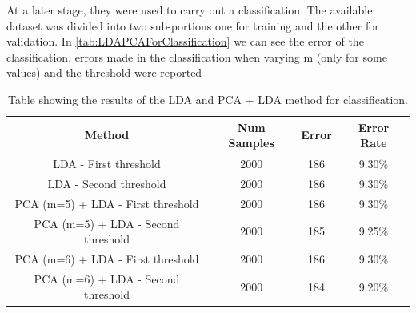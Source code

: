 At a later stage, they were used to carry out a classification.
The available dataset was divided into two sub-portions one for training and the other for validation.
In \autoref{tab:LDAPCAForClassification} we can see the error of the classification,
errors made in the classification when varying m (only for some values) and the threshold were reported

\begin{table}
    \centering
    \begin{tabular}{c c c c}
        \toprule
        Method                             & Num Samples & Error & Error Rate \\
        \midrule
        LDA - First threshold              & 2000        & 186   & 9.30\%     \\
        LDA - Second threshold             & 2000        & 186   & 9.30\%     \\
        \midrule
        PCA (m=5) + LDA - First threshold  & 2000        & 186   & 9.30\%     \\
        PCA (m=5) + LDA - Second threshold & 2000        & 185   & 9.25\%     \\
        PCA (m=6) + LDA - First threshold  & 2000        & 186   & 9.30\%     \\
        PCA (m=6) + LDA - Second threshold & 2000        & 184   & 9.20\%     \\
        \bottomrule
    \end{tabular}
    \captionsetup{justification=justified,singlelinecheck=false,format=hang}
    \caption{Table showing the results of the LDA and PCA + LDA method for classification.}
    \label{tab:LDAPCAForClassification}
\end{table}








